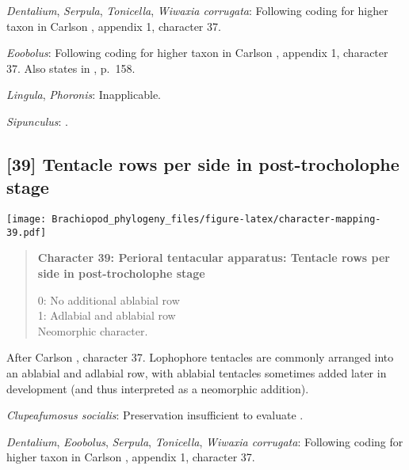 \documentclass[openany]{book}
\theoremstyle{definition}
\theoremstyle{definition}
\theoremstyle{definition}
\theoremstyle{remark}
\begin{document}
\hypertarget{Dentalium-coding-38}{}
\emph{Dentalium}, \emph{Serpula}, \emph{Tonicella}, \emph{Wiwaxia
corrugata}: Following coding for higher taxon in Carlson
\citeyearpar{Carlson1995Phylogeneticrelationships}, appendix 1,
character 37.

\hypertarget{Eoobolus-coding-38}{}
\emph{Eoobolus}: Following coding for higher taxon in Carlson
\citeyearpar{Carlson1995Phylogeneticrelationships}, appendix 1,
character 37. Also states in
\citet{Williams2000LinguliformeaCraniiformea}, p.~158.

\hypertarget{Lingula-coding-38}{}
\emph{Lingula}, \emph{Phoronis}: Inapplicable.

\hypertarget{Sipunculus-coding-38}{}
\emph{Sipunculus}: \citep{Temereva2016Thenervous}.

\subsection*{{[}39{]} Tentacle rows per side in post-trocholophe
stage}\label{tentacle-rows-per-side-in-post-trocholophe-stage}

\texttt{[image: Brachiopod\_phylogeny\_files/figure-latex/character-mapping-39.pdf]}

\begin{quote}
\textbf{Character 39: Perioral tentacular apparatus: Tentacle rows per
side in post-trocholophe stage}

0: No additional ablabial row\\
1: Adlabial and ablabial row\\
Neomorphic character.
\end{quote}

After Carlson \citeyearpar{Carlson1995Phylogeneticrelationships},
character 37. Lophophore tentacles are commonly arranged into an
ablabial and adlabial row, with ablabial tentacles sometimes added later
in development (and thus interpreted as a neomorphic addition).

\hypertarget{Clupeafumosus_socialis-coding-39}{}
\emph{Clupeafumosus socialis}: Preservation insufficient to evaluate
\citep{Holmer2006Aspinose}.

\hypertarget{Dentalium-coding-39}{}
\emph{Dentalium}, \emph{Eoobolus}, \emph{Serpula}, \emph{Tonicella},
\emph{Wiwaxia corrugata}: Following coding for higher taxon in Carlson
\citeyearpar{Carlson1995Phylogeneticrelationships}, appendix 1,
character 37.
\end{document}
